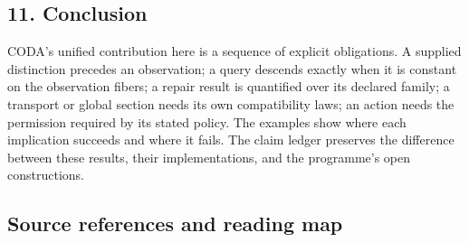 \documentclass[
  11pt,
]{article}
\begin{document}
\subsection{11. Conclusion}\label{conclusion}

CODA's unified contribution here is a sequence of explicit obligations. A supplied distinction precedes an observation; a query descends exactly when it is constant on the observation fibers; a repair result is quantified over its declared family; a transport or global section needs its own compatibility laws; an action needs the permission required by its stated policy. The examples show where each implication succeeds and where it fails. The claim ledger preserves the difference between these results, their implementations, and the programme's open constructions.

\subsection{Source references and reading map}\label{source-references-and-reading-map}
\end{document}
